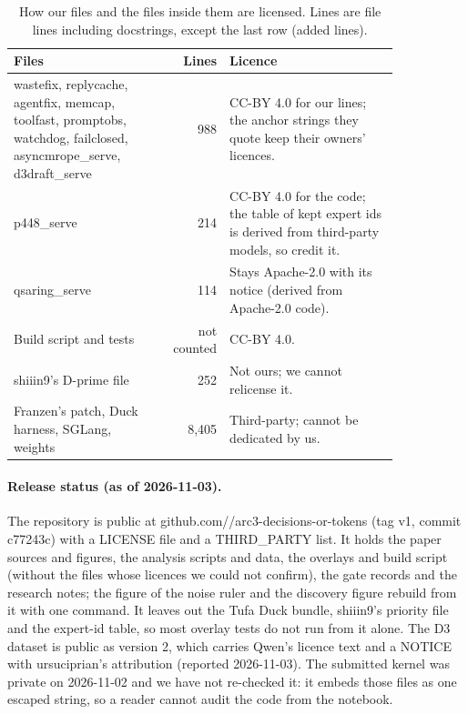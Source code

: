 \begin{table}[!htb]
\caption{How our files and the files inside them are licensed. Lines are file lines including docstrings, except the last row (added lines).}\label{tab:release}
\centering\footnotesize
\setlength{\tabcolsep}{3pt}
\renewcommand{\arraystretch}{1.1}
\begin{tabular}{@{}>{\raggedright\arraybackslash}p{0.40\linewidth}r>{\raggedright\arraybackslash}p{0.44\linewidth}@{}}
\toprule
Files & Lines & Licence \\
\midrule
wastefix, replycache, agentfix, memcap, toolfast, promptobs, watchdog, failclosed, asyncmrope\_serve, d3draft\_serve & 988 & CC-BY 4.0 for our lines; the anchor strings they quote keep their owners' licences. \\ %
p448\_serve & 214 & CC-BY 4.0 for the code; the table of kept expert ids is derived from third-party models, so credit it. \\ %
qsaring\_serve & 114 & Stays Apache-2.0 with its notice (derived from Apache-2.0 code). \\ %
Build script and tests & not counted & CC-BY 4.0. \\
shiiin9's D-prime file & 252 & Not ours; we cannot relicense it. \\ %
Franzen's patch, Duck harness, SGLang, weights & 8,405 & Third-party; cannot be dedicated by us. \\ %
\bottomrule
\end{tabular}
\end{table}

\paragraph{Release status (as of 2026-11-03).} The repository is public at github.com/\ownerid/arc3-decisions-or-tokens (tag v1, commit c77243c) with a LICENSE file and a THIRD\_PARTY list. It holds the paper sources and figures, the analysis scripts and data, the overlays and build script (without the files whose licences we could not confirm), the gate records and the research notes; the figure of the noise ruler and the discovery figure rebuild from it with one command. It leaves out the Tufa Duck bundle, shiiin9's priority file and the expert-id table, so most overlay tests do not run from it alone. The D3 dataset is public as version 2, which carries Qwen's licence text and a NOTICE with ursuciprian's attribution (reported 2026-11-03). The submitted kernel was private on 2026-11-02 and we have not re-checked it: it embeds those files as one escaped string, so a reader cannot audit the code from the notebook. %
